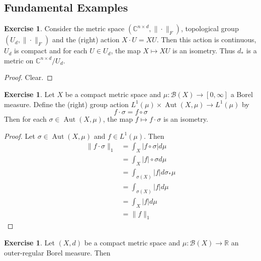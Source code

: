 \documentclass[12pt]{amsart}
\theoremstyle{definition}
\newtheorem{ex}[definition]{Exercise}
\newcommand{\sig}{\sigma}
\newcommand{\C}{\mathbb{C}}
\newcommand{\R}{\mathbb{R}}
\newcommand{\MB}{\mathcal{B}}
\newcommand{\RG}{[0,\infty]}
\DeclareMathOperator{\Aut}{Aut}
\newcommand{\lex}[1]{\label{ex:#1}}
\begin{document}
	
	
	
	
	
	
	
	
	
	
	\newpage
	\subsection{Fundamental Examples}
	\begin{ex} \lex{}
	Consider the metric space $(\C^{n \times d}, \|\cdot\|_F)$, topological group $(U_d, \|\cdot\|_F)$ and  the (right) action $X \cdot U = XU$. Then this action is continuous, $U_d$ is compact and for each $U \in U_d$, the map $X \mapsto XU$ is an isometry. Thus $d_*$ is a metric on $\C^{n \times d}/ U_d$.
	\end{ex}
	
	\begin{proof}
	Clear.
	\end{proof}		
	
	\begin{ex} \lex{}
	Let $X$ be a compact metric space and $\mu:\MB(X) \rightarrow \RG$ a Borel measure. Define the (right) group action $L^1(\mu) \times \Aut(X, \mu) \rightarrow L^1(\mu) $ by $$f \cdot \sig = f \circ \sig$$ Then for each $\sig \in \Aut(X, \mu)$, the map $f \mapsto f \cdot \sig$ is an isometry. 
	\end{ex}
	
	\begin{proof}
	Let $\sig \in \Aut(X, \mu)$ and $f \in L^1(\mu)$. 
Then 
	\begin{align*}
	\|f \cdot \sig\|_1
	&=  \int_X |f \circ \sig| d\mu \\
	&=  \int_X |f| \circ \sig d\mu \\
	&=  \int_{\sig(X)} |f| d \sig_* \mu  \\
	&=  \int_{\sig(X)} |f| d \mu \\
	&=  \int_{X} |f| d \mu \\
	&= \|f\|_1 
	\end{align*}	 
	\end{proof}
	
	\begin{ex} \lex{}
	Let $(X,d)$ be a compact metric space and $\mu: \MB(X) \rightarrow \R$ an outer-regular Borel measure. Then 
	\end{ex}
	
	
	
	
	
	
	
\end{document}
